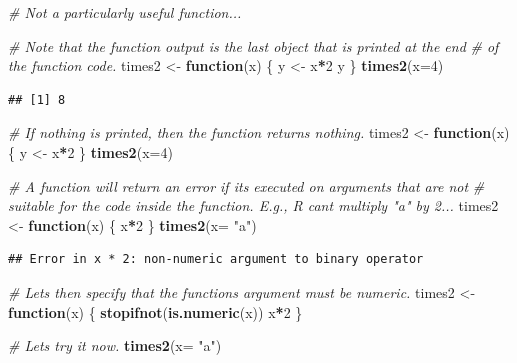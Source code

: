 \documentclass[
]{book}
\newenvironment{Shaded}{\begin{snugshade}}{\end{snugshade}}
\newcommand{\AttributeTok}[1]{\textcolor[rgb]{0.13,0.29,0.53}{#1}}
\newcommand{\CommentTok}[1]{\textcolor[rgb]{0.56,0.35,0.01}{\textit{#1}}}
\newcommand{\ControlFlowTok}[1]{\textcolor[rgb]{0.13,0.29,0.53}{\textbf{#1}}}
\newcommand{\DecValTok}[1]{\textcolor[rgb]{0.00,0.00,0.81}{#1}}
\newcommand{\FunctionTok}[1]{\textcolor[rgb]{0.13,0.29,0.53}{\textbf{#1}}}
\newcommand{\NormalTok}[1]{#1}
\newcommand{\OtherTok}[1]{\textcolor[rgb]{0.56,0.35,0.01}{#1}}
\newcommand{\SpecialCharTok}[1]{\textcolor[rgb]{0.81,0.36,0.00}{\textbf{#1}}}
\newcommand{\StringTok}[1]{\textcolor[rgb]{0.31,0.60,0.02}{#1}}
\begin{document}
\begin{Shaded}
\begin{Highlighting}[]
\CommentTok{\# Not a particularly useful function...}

\CommentTok{\# Note that the function output is the last object that is printed at the end}
\CommentTok{\# of the function code.}
\NormalTok{times2 }\OtherTok{\textless{}{-}} \ControlFlowTok{function}\NormalTok{(x) \{}
\NormalTok{  y }\OtherTok{\textless{}{-}}\NormalTok{ x}\SpecialCharTok{*}\DecValTok{2}
\NormalTok{  y}
\NormalTok{\}}
\FunctionTok{times2}\NormalTok{(}\AttributeTok{x=}\DecValTok{4}\NormalTok{)}
\end{Highlighting}
\end{Shaded}

\begin{verbatim}
## [1] 8
\end{verbatim}

\begin{Shaded}
\begin{Highlighting}[]
\CommentTok{\# If nothing is printed, then the function returns nothing.}
\NormalTok{times2 }\OtherTok{\textless{}{-}} \ControlFlowTok{function}\NormalTok{(x) \{}
\NormalTok{  y }\OtherTok{\textless{}{-}}\NormalTok{ x}\SpecialCharTok{*}\DecValTok{2}
\NormalTok{\}}
\FunctionTok{times2}\NormalTok{(}\AttributeTok{x=}\DecValTok{4}\NormalTok{)}

\CommentTok{\# A function will return an error if it\textquotesingle{}s executed on arguments that are not}
\CommentTok{\# suitable for the code inside the function. E.g., R can\textquotesingle{}t multiply "a" by 2...}
\NormalTok{times2 }\OtherTok{\textless{}{-}} \ControlFlowTok{function}\NormalTok{(x) \{}
\NormalTok{  x}\SpecialCharTok{*}\DecValTok{2}
\NormalTok{\}}
\FunctionTok{times2}\NormalTok{(}\AttributeTok{x=} \StringTok{"a"}\NormalTok{)}
\end{Highlighting}
\end{Shaded}

\begin{verbatim}
## Error in x * 2: non-numeric argument to binary operator
\end{verbatim}

\begin{Shaded}
\begin{Highlighting}[]
\CommentTok{\# Let\textquotesingle{}s then specify that the function\textquotesingle{}s argument must be numeric.}
\NormalTok{times2 }\OtherTok{\textless{}{-}} \ControlFlowTok{function}\NormalTok{(x) \{}
  \FunctionTok{stopifnot}\NormalTok{(}\FunctionTok{is.numeric}\NormalTok{(x))  }
\NormalTok{  x}\SpecialCharTok{*}\DecValTok{2}
\NormalTok{\}}

\CommentTok{\# Let\textquotesingle{}s try it now.}
\FunctionTok{times2}\NormalTok{(}\AttributeTok{x=} \StringTok{"a"}\NormalTok{)}
\end{Highlighting}
\end{Shaded}
\end{document}
